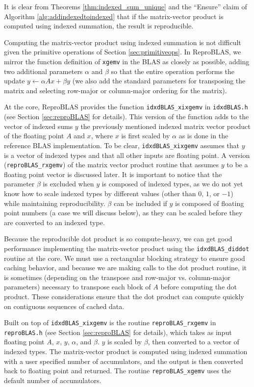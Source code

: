   It is clear from Theorems \ref{thm:indexed_sum_unique} and the ``Ensure'' claim of Algorithm \ref{alg:addindexedtoindexed} that if the matrix-vector product is computed using indexed summation, the result is reproducible.

  Computing the matrix-vector product using indexed summation is not difficult given the primitive operations of Section \ref{sec:primitiveops}. In ReproBLAS, we mirror the function definition of \texttt{xgemv} in the BLAS as closely as possible, adding two additional parameters $\alpha$ and $\beta$ so that the entire operation performs the update $y \gets \alpha Ax + \beta y$ (we also add the standard parameters for transposing the matrix and selecting row-major or column-major ordering for the matrix).

  At the core, ReproBLAS provides the function \texttt{idxdBLAS\_xixgemv} in \texttt{idxdBLAS.h} (see Section \ref{sec:reproBLAS} for details). This version of the function adds to the vector of indexed sums $y$ the previously mentioned indexed matrix vector product of the floating point $A$ and $x$, where $x$ is first scaled by $\alpha$ as is done in the reference BLAS implementation. To be clear, \texttt{idxdBLAS\_xixgemv} assumes that $y$ is a vector of indexed types and that all other inputs are floating point. A version (\texttt{reproBLAS\_rxgemv}) of the matrix vector product routine that assumes $y$ to be a floating point vector is discussed later. 
  It is important to notice that the parameter $\beta$ is excluded when $y$ is composed of indexed types, as we do not yet know how to scale indexed types by different values (other than $0$, $1$, or $-1$) while maintaining reproducibility. $\beta$ can be included if $y$ is composed of floating point numbers (a case we will discuss below), as they can be scaled before they are converted to an indexed type.

  Because the reproducible dot product is so compute-heavy, we can get good performance implementing the matrix-vector product using the \texttt{idxdBLAS\_diddot} routine at the core. We must use a rectangular blocking strategy to ensure good caching behavior, and because we are making calls to the dot product routine, it is sometimes (depending on the transpose and row-major vs. column-major parameters) necessary to transpose each block of $A$ before computing the dot product. These considerations ensure that the dot product can compute quickly on contiguous sequences of cached data.

  Built on top of \texttt{idxdBLAS\_xixgemv} is the routine \texttt{reproBLAS\_rxgemv} in \texttt{reproBLAS.h} (see Section \ref{sec:reproBLAS} for details), which takes as input floating point $A$, $x$, $y$, $\alpha$, and $\beta$. $y$ is scaled by $\beta$, then converted to a vector of indexed types. The matrix-vector product is computed using indexed summation with a user specified number of accumulators, and the output is then converted back to floating point and returned. The routine \texttt{reproBLAS\_xgemv} uses the default number of accumulators.

